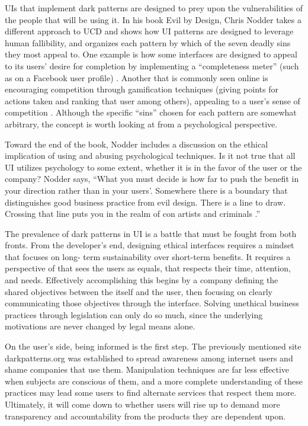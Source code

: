 \documentclass[12pt, oneside]{article}
\begin{document}
UIs that implement dark patterns are designed to prey upon the vulnerabilities of the people that will be using it. In his book Evil by Design, Chris Nodder takes a different approach to UCD and shows how UI patterns are designed to leverage human fallibility, and organizes each pattern by which of the seven deadly sins they most appeal to. One example is how some interfaces are designed to appeal to its users' desire for completion by implementing a ``completeness meter'' (such as on a Facebook user profile) \cite[p.~48]{nodder_2013}. Another that is commonly seen online is encouraging competition through gamification techniques (giving points for actions taken and ranking that user among others), appealing to a user's sense of competition \cite[p.~246]{nodder_2013}. Although the specific ``sins'' chosen for each pattern are somewhat arbitrary, the concept is worth looking at from a psychological perspective.

Toward the end of the book, Nodder includes a discussion on the ethical implication of using and abusing psychological techniques. Is it not true that all UI utilizes psychology to some extent, whether it is in the favor of the user or the company? Nodder says, ``What you must decide is how far to push the benefit in your direction rather than in your users’. Somewhere there is a boundary that distinguishes good business practice from evil design. There is a line to draw. Crossing that line puts you in the realm of con artists and criminals \cite[p.~293]{nodder_2013}.''

The prevalence of dark patterns in UI is a battle that must be fought from both fronts. From the developer's end, designing ethical interfaces requires a mindset that focuses on long- term sustainability over short-term benefits. It requires a perspective of that sees the users as equals, that respects their time, attention, and needs. Effectively accomplishing this begins by a company defining the shared objectives between the itself and the user, then focusing on clearly communicating those objectives through the interface. Solving unethical business practices through legislation can only do so much, since the underlying motivations are never changed by legal means alone.

On the user's side, being informed is the first step. The previously mentioned site darkpatterns.org was established to spread awareness among internet users and shame companies that use them. Manipulation techniques are far less effective when subjects are conscious of them, and a more complete understanding of these practices may lead some users to find alternate services that respect them more. Ultimately, it will come down to whether users will rise up to demand more transparency and accountability from the products they are dependent upon.
\end{document}
